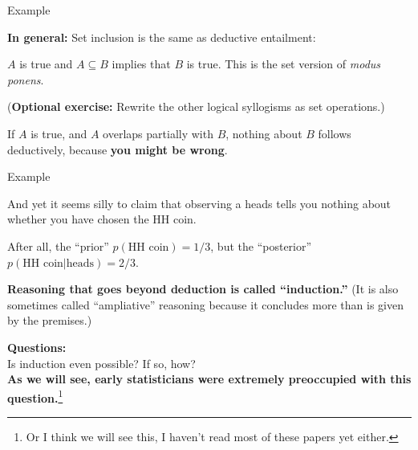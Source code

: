 \documentclass[8pt]{beamer}\usepackage[]{graphicx}\usepackage[]{color}
\begin{document}

\begin{frame}{Example}
    \setminipage{}

\textbf{In general:} Set inclusion is the same as deductive entailment:

$A$ is true and $A \subseteq B$ implies that $B$ is true.
This is the set version of {\em modus ponens}.

(\textbf{Optional exercise:} Rewrite the other logical syllogisms as set operations.)

If $A$ is true, and $A$ overlaps partially with $B$, nothing about $B$
follows deductively, because \textbf{you might be wrong}.

\end{frame}


\begin{frame}{Example}
    \setminipage{}

And yet it seems silly to claim that observing a heads tells you
nothing about whether you have chosen the HH coin.

After all,  the ``prior'' $p(\textrm{HH coin}) = 1/3$,
but the ``posterior'' $p(\textrm{HH coin} | \textrm{heads}) =
2/3$.

\pause

\textbf{Reasoning that goes beyond deduction is called ``induction.''} (It is
also sometimes called ``ampliative'' reasoning because it concludes more than is
given by the premises.)

\pause
\textbf{Questions:}\\
Is induction even possible?  If so, how?\\
\textbf{As we will see, early statisticians were extremely preoccupied
with this question.}\footnote{Or I think we will see this,
I haven't read most of these papers yet either.}


\end{frame}
\end{document}
